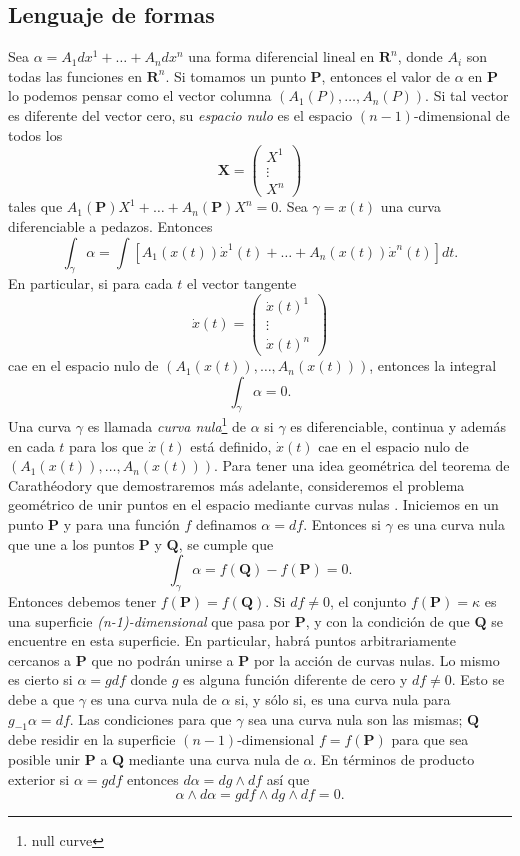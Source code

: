 \documentclass{article}
\theoremstyle{definition} \newtheorem{defi}{Definici\'on}
\theoremstyle{definition} \newtheorem{teo}{Teorema}
\theoremstyle{definition} \newtheorem{cor}{Corolario}
\begin{document}
\subsection{Lenguaje de formas}
Sea $\alpha=A_1dx^1+\dots+A_ndx^n$ una forma diferencial lineal en $\mathbf{R}^n$, donde $A_i$ son todas las funciones en $\mathbf{R}^n$. Si tomamos un punto $\mathbf{P}$, entonces el valor de $\alpha$ en $\mathbf{P}$ lo podemos pensar como el vector columna $(A_1(P),\dots,A_n(P))$. Si tal vector es diferente del vector cero, su \emph{espacio nulo} es el espacio $(n-1)$-dimensional de todos los 
\begin{equation*}
\mathbf{X}=
\begin{pmatrix}X^1 \\ \vdots \\ X^n 
\end{pmatrix}
\end{equation*}
tales que $A_1(\mathbf{P})X^1+\dots+A_n(\mathbf{P})X^n=0$.
Sea $\gamma=x(t)$ una curva diferenciable a pedazos. Entonces $$\int_{\gamma}\alpha=\int[A_1(x(t))\dot{x}^1(t)+\dots+A_n(x(t))\dot{x}^n(t)]dt.$$
En particular, si para cada $t$ el vector tangente
\begin{equation*}
\dot{x}(t)=
\begin{pmatrix}\dot{x}(t)^1 \\ \vdots \\ \dot{x}(t)^n 
\end{pmatrix}
\end{equation*}
cae en el espacio nulo de $(A_1(x(t)),\dots,A_n(x(t)))$, entonces la integral $$\int_{\gamma}\alpha=0.$$
Una curva $\gamma$ es llamada \emph{curva nula}\footnote{null curve} de $\alpha$ si $\gamma$ es diferenciable, continua y adem\'as en cada $t$ para los que $\dot{x}(t)$ est\'a definido, $\dot{x}(t)$ cae en el espacio nulo de $(A_1(x(t)),\dots,A_n(x(t)))$. Para tener una idea geom\'etrica del teorema de Carath\'eodory que demostraremos m\'as adelante, consideremos el problema geom\'etrico de unir puntos en el espacio mediante curvas nulas \cite{cm}. Iniciemos en un punto $\mathbf{P}$ y para una funci\'on $f$ definamos $\alpha=df$. Entonces si $\gamma$ es una curva nula que une a los puntos $\mathbf{P}$ y $\mathbf{Q}$, se cumple que $$\int_{\gamma}\alpha=f(\mathbf{Q})-f(\mathbf{P})=0.$$Entonces debemos tener $f(\mathbf{P})=f(\mathbf{Q})$. Si $df\neq0$, el conjunto $f(\mathbf{P})=\kappa$ es una superficie \emph{(n-1)-dimensional} que pasa por $\mathbf{P}$, y con la condici\'on de que $\mathbf{Q}$ se encuentre en esta superficie. En particular, habr\'a puntos arbitrariamente cercanos a $\mathbf{P}$ que no podr\'an unirse a $\mathbf{P}$ por la acci\'on de curvas nulas. Lo mismo es cierto si $\alpha=gdf$ donde $g$ es alguna funci\'on diferente de cero y $df\neq0$. Esto se debe a que $\gamma$ es una curva nula de $\alpha$ si, y s\'olo si, es una curva nula para $g_{-1}\alpha=df$. Las condiciones para que $\gamma$ sea una curva nula son las mismas; $\mathbf{Q}$ debe residir en la superficie $(n-1)$-dimensional $f=f(\mathbf{P})$ para que sea posible unir $\mathbf{P}$ a $\mathbf{Q}$ mediante una curva nula de $\alpha$. En t\'erminos de producto exterior si $\alpha=gdf$ entonces $d\alpha=dg\wedge df$ as\'i que $$\alpha \wedge d\alpha=gdf\wedge dg \wedge df = 0.$$
\end{document}
